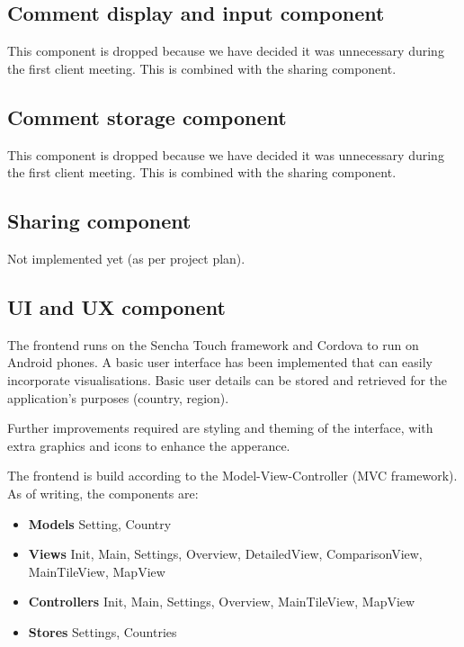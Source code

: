 \documentclass[12pt,a4paper,twoside]{article}
\begin{document}
\subsection{Comment display and input component}
This component is dropped because we have decided it was unnecessary during the first client meeting. This is combined with the sharing component.

\subsection{Comment storage component}
This component is dropped because we have decided it was unnecessary during the first client meeting. This is combined with the sharing component.

\subsection{Sharing component}
Not implemented yet (as per project plan).

\subsection{UI and UX component}
The frontend runs on the Sencha Touch framework and Cordova to run on Android phones. A basic user interface has been implemented that can easily incorporate visualisations. Basic user details can be stored and retrieved for the application's purposes (country, region).

Further improvements required are styling and theming of the interface, with extra graphics and icons to enhance the apperance.

The frontend is build according to the Model-View-Controller (MVC framework). As of writing, the components are:

\begin{itemize}
	\item \textbf{Models} Setting, Country
	\item \textbf{Views} Init, Main, Settings, Overview, DetailedView, ComparisonView, MainTileView, MapView
	\item \textbf{Controllers} Init, Main, Settings, Overview, MainTileView, MapView
	\item \textbf{Stores} Settings, Countries
\end{itemize}
\end{document}
